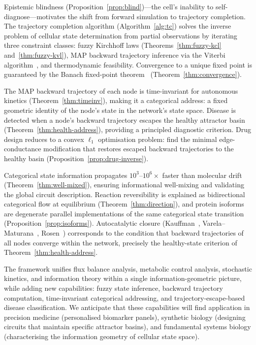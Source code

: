 \documentclass[twocolumn,10pt,a4paper]{article}
\begin{document}
Epistemic blindness (Proposition~\ref{prop:blind})---the cell's inability to
self-diagnose---motivates the shift from forward simulation to trajectory
completion.  The trajectory completion algorithm (Algorithm~\ref{alg:tc}) solves
the inverse problem of cellular state determination from partial observations by
iterating three constraint classes: fuzzy Kirchhoff laws
(Theorems~\ref{thm:fuzzy-kcl} and~\ref{thm:fuzzy-kvl}), MAP backward trajectory
inference via the Viterbi algorithm~\cite{Viterbi1967,Forney1973}, and
thermodynamic feasibility.  Convergence to a unique fixed point is guaranteed
by the Banach fixed-point theorem~\cite{Banach1922}
(Theorem~\ref{thm:convergence}).

The MAP backward trajectory of each node is time-invariant for autonomous
kinetics (Theorem~\ref{thm:timeinv}), making it a categorical address: a fixed
geometric identity of the node's state in the network's state space.  Disease
is detected when a node's backward trajectory escapes the healthy attractor
basin (Theorem~\ref{thm:health-address}), providing a principled diagnostic
criterion.  Drug design reduces to a convex $\ell_1$ optimisation problem:
find the minimal edge-conductance modification that restores escaped backward
trajectories to the healthy basin (Proposition~\ref{prop:drug-inverse}).

Categorical state information propagates $10^3$--$10^6\times$ faster than
molecular drift (Theorem~\ref{thm:well-mixed}), ensuring informational
well-mixing and validating the global circuit description.  Reaction
reversibility is explained as bidirectional categorical flow at equilibrium
(Theorem~\ref{thm:direction}), and protein isoforms are degenerate parallel
implementations of the same categorical state transition
(Proposition~\ref{prop:isoforms}).  Autocatalytic closure
(Kauffman~\cite{Kauffman1993}, Varela--Maturana~\cite{VarelaMaturanaUribe1974},
Rosen~\cite{Rosen1991}) corresponds to the condition that backward trajectories
of all nodes converge within the network, precisely the healthy-state criterion
of Theorem~\ref{thm:health-address}.

The framework unifies flux balance analysis, metabolic control analysis,
stochastic kinetics, and information theory within a single information-geometric
picture, while adding new capabilities: fuzzy state inference, backward
trajectory computation, time-invariant categorical addressing, and
trajectory-escape-based disease classification.  We anticipate that these
capabilities will find application in precision medicine (personalised biomarker
panels), synthetic biology (designing circuits that maintain specific attractor
basins), and fundamental systems biology (characterising the information geometry
of cellular state space).



\end{document}
